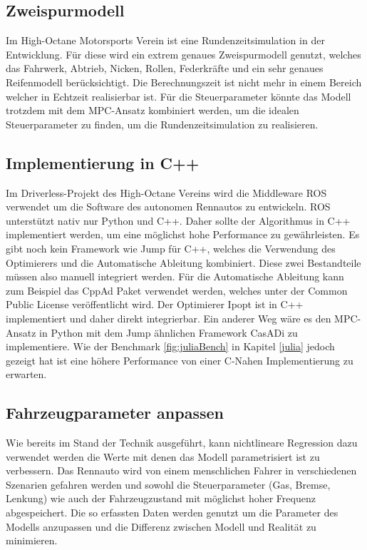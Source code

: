 \documentclass{like}
\begin{document}
\subsection{Zweispurmodell}
Im High-Octane Motorsports Verein ist eine Rundenzeitsimulation in der Entwicklung. Für diese wird ein extrem genaues Zweispurmodell genutzt, welches das Fahrwerk, Abtrieb, Nicken, Rollen, Federkräfte und ein sehr genaues Reifenmodell berücksichtigt. Die Berechnungszeit ist nicht mehr in einem Bereich welcher in Echtzeit realisierbar ist. Für die Steuerparameter könnte das Modell trotzdem mit dem \ac{MPC}-Ansatz kombiniert werden, um die idealen Steuerparameter zu finden, um die Rundenzeitsimulation zu realisieren. 

\subsection{Implementierung in C++}
Im Driverless-Projekt des High-Octane Vereins wird die Middleware \ac{ROS} verwendet um die Software des autonomen Rennautos zu entwickeln. \ac{ROS} unterstützt nativ nur Python und C++. Daher sollte der Algorithmus in C++ implementiert werden, um eine möglichst hohe Performance zu gewährleisten. 
Es gibt noch kein Framework wie \ac{Jump} für C++, welches die Verwendung des Optimierers und die Automatische Ableitung kombiniert. Diese zwei Bestandteile müssen also manuell integriert werden. Für die Automatische Ableitung kann zum Beispiel das CppAd Paket verwendet werden, welches unter der Common Public License veröffentlicht wird. Der Optimierer \ac{Ipopt} ist in C++ implementiert und daher direkt integrierbar. 
Ein anderer Weg wäre es den \ac{MPC}-Ansatz in Python mit dem \ac{Jump} ähnlichen Framework CasADi zu implementiere. Wie der Benchmark \ref{fig:juliaBench} in Kapitel \ref{julia} jedoch gezeigt hat ist eine höhere Performance von einer C-Nahen Implementierung zu erwarten. 

\subsection{Fahrzeugparameter anpassen}
Wie bereits im Stand der Technik ausgeführt, kann nichtlineare Regression dazu verwendet werden die Werte mit denen das Modell parametrisiert ist zu verbessern. Das Rennauto wird von einem menschlichen Fahrer in verschiedenen Szenarien gefahren werden und sowohl die Steuerparameter (Gas, Bremse, Lenkung) wie auch der Fahrzeugzustand mit möglichst hoher Frequenz abgespeichert. Die so erfassten Daten werden genutzt um die Parameter des Modells anzupassen und die Differenz zwischen Modell und Realität zu minimieren. 


\appendix





%


\listoffigures
\listoftables

%


\end{document}
